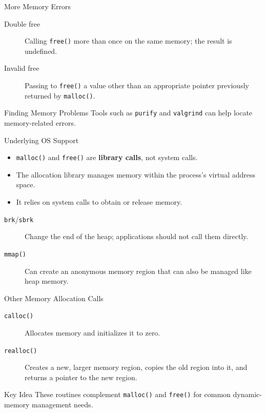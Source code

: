 \begin{frame}{More Memory Errors}
    \begin{description}
        \item[Double free]
        Calling \texttt{free()} more than once on the same memory;
        the result is undefined.

        \item[Invalid free]
        Passing to \texttt{free()} a value other than an appropriate
        pointer previously returned by \texttt{malloc()}.
    \end{description}

    \begin{block}{Finding Memory Problems}
        Tools such as \texttt{purify} and \texttt{valgrind}
        can help locate memory-related errors.
    \end{block}
\end{frame}


\begin{frame}{Underlying OS Support}
    \begin{itemize}
        \item \texttt{malloc()} and \texttt{free()} are
              \textbf{library calls}, not system calls.
        \item The allocation library manages memory within the
              process's virtual address space.
        \item It relies on system calls to obtain or release memory.
    \end{itemize}

    \begin{description}
        \item[\texttt{brk}/\texttt{sbrk}]
        Change the end of the heap; applications should not call
        them directly.

        \item[\texttt{mmap()}]
        Can create an anonymous memory region that can also be
        managed like heap memory.
    \end{description}
\end{frame}


\begin{frame}{Other Memory Allocation Calls}
    \begin{description}
        \item[\texttt{calloc()}]
        Allocates memory and initializes it to zero.

        \item[\texttt{realloc()}]
        Creates a new, larger memory region, copies the old region
        into it, and returns a pointer to the new region.
    \end{description}

    \begin{block}{Key Idea}
        These routines complement \texttt{malloc()} and
        \texttt{free()} for common dynamic-memory management needs.
    \end{block}
\end{frame}


